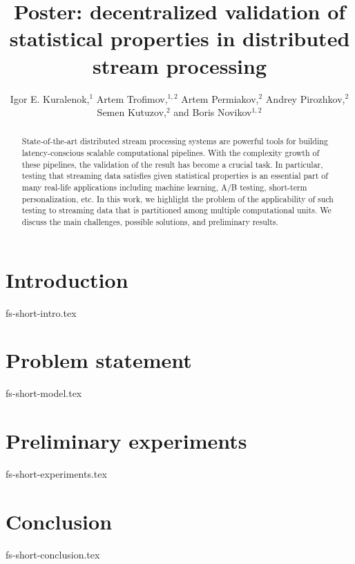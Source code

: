 \documentclass[sigconf]{acmart}
\theoremstyle{remark}
\begin{document}

\title {Poster: decentralized validation of statistical properties in distributed stream processing}

\author{  Igor E. Kuralenok,$^1$     Artem Trofimov,$^ {1,2}$    Artem Permiakov,$^ {2}$   Andrey Pirozhkov,$^ {2}$    Semen Kutuzov,$^ {2}$  and  Boris Novikov$^ {1,2}$ }

\begin{abstract}
State-of-the-art distributed stream processing systems are powerful tools for building latency-conscious scalable computational pipelines. With the complexity growth of these pipelines, the validation of the result has become a crucial task. In particular, testing that streaming data satisfies given statistical properties is an essential part of many real-life applications including machine learning, A/B testing, short-term personalization, etc. In this work, we highlight the problem of the applicability of such testing to streaming data that is partitioned among multiple computational units. We discuss the main challenges, possible solutions, and preliminary results.
\end{abstract}


\maketitle

\thispagestyle{empty}

\section {Introduction}
 {fs-short-intro.tex}


\section {Problem statement}
 {fs-short-model.tex}

\section {Preliminary experiments}
 {fs-short-experiments.tex}


\section {Conclusion}
 {fs-short-conclusion.tex}



\end{document}
